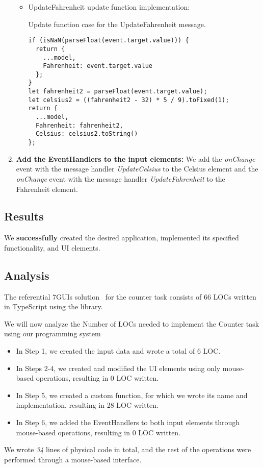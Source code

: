\begin{enumerate}
\begin{itemize}
		      \item UpdateFahrenheit update function implementation:
		            \begin{listing}[htbp]
			            \caption{Update function case for the UpdateFahrenheit message.}

			            \begin{lstlisting}
if (isNaN(parseFloat(event.target.value))) {
  return {
    ...model,
    Fahrenheit: event.target.value
  };
}
let fahrenheit2 = parseFloat(event.target.value);
let celsius2 = ((fahrenheit2 - 32) * 5 / 9).toFixed(1);
return {
  ...model,
  Fahrenheit: fahrenheit2,
  Celsius: celsius2.toString()
};            \end{lstlisting}

		            \end{listing}
	      \end{itemize}

	\item \textbf{Add the EventHandlers to the input elements:} We add the \emph{onChange} event with the message handler \emph{UpdateCelsius} to the Celsius element and the \emph{onChange} event with the message handler \emph{UpdateFahrenheit} to the Fahrenheit element.
\end{enumerate}
\medskip
\subsection{Results}
We \textbf{successfully} created the desired application, implemented its specified functionality, and UI elements.
\medskip
\subsection{Analysis}
The referential 7GUIs solution~\cite{7guis-React-TypeScript-MobX/src/app/guis/counter.tsx} for the counter task consists of 66 LOCs written in TypeScript using the \citet{react} library.

We will now analyze the Number of LOCs needed to implement the Counter task using our programming system
\begin{itemize}
	\item In Step 1, we created the input data and wrote a total of 6 LOC.
	\item   In Steps 2-4, we created and modified the UI elements using only mouse-based operations, resulting in 0 LOC written.
	\item   In Step 5, we created a custom function, for which we wrote its name and implementation, resulting in 28 LOC written.
	\item   In Step 6, we added the EventHandlers to both input elements through mouse-based operations, resulting in 0 LOC written.
\end{itemize}
\noindent We wrote \emph{34} lines of physical code in total, and the rest of the operations were performed through a mouse-based interface.




